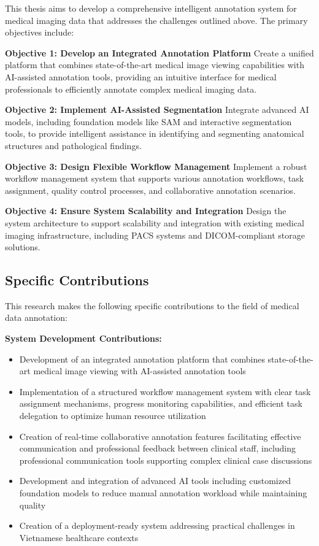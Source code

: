 This thesis aims to develop a comprehensive intelligent annotation system for medical imaging data that addresses the challenges outlined above. The primary objectives include:

\textbf{Objective 1: Develop an Integrated Annotation Platform}
Create a unified platform that combines state-of-the-art medical image viewing capabilities with AI-assisted annotation tools, providing an intuitive interface for medical professionals to efficiently annotate complex medical imaging data.

\textbf{Objective 2: Implement AI-Assisted Segmentation}
Integrate advanced AI models, including foundation models like SAM and interactive segmentation tools, to provide intelligent assistance in identifying and segmenting anatomical structures and pathological findings.

\textbf{Objective 3: Design Flexible Workflow Management}
Implement a robust workflow management system that supports various annotation workflows, task assignment, quality control processes, and collaborative annotation scenarios.

\textbf{Objective 4: Ensure System Scalability and Integration}
Design the system architecture to support scalability and integration with existing medical imaging infrastructure, including PACS systems and DICOM-compliant storage solutions.

\subsection{Specific Contributions}

This research makes the following specific contributions to the field of medical data annotation:

\textbf{System Development Contributions:}
\begin{itemize}
    \item Development of an integrated annotation platform that combines state-of-the-art medical image viewing with AI-assisted annotation tools
    \item Implementation of a structured workflow management system with clear task assignment mechanisms, progress monitoring capabilities, and efficient task delegation to optimize human resource utilization
    \item Creation of real-time collaborative annotation features facilitating effective communication and professional feedback between clinical staff, including professional communication tools supporting complex clinical case discussions
    \item Development and integration of advanced AI tools including customized foundation models to reduce manual annotation workload while maintaining quality
    \item Creation of a deployment-ready system addressing practical challenges in Vietnamese healthcare contexts
\end{itemize}

